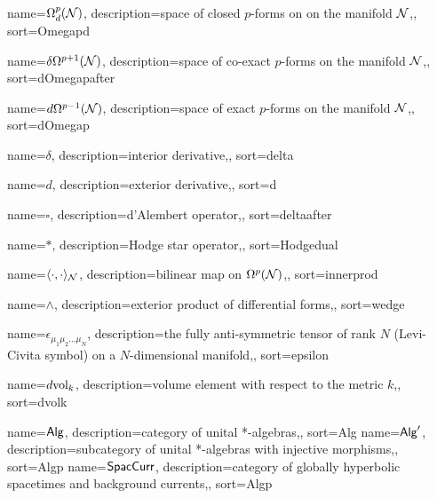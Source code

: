{
	name=\ensuremath{\Omega^p_{d}(\N)},
	description={space of closed $p$-forms on on the manifold $\mathcal{N}$,},
	sort={Omegapd}
}

{
	name=\ensuremath{\delta \Omega^{p+1}(\N)},
	description={space of co-exact $p$-forms on the manifold $\mathcal{N}$,},
	sort={dOmegapafter}
}

{
	name=\ensuremath{d \Omega^{p-1}(\N)},
	description={space of exact $p$-forms on the manifold $\mathcal{N}$,},
	sort={dOmegap}
}




{
	name=\ensuremath{\delta},
	description={interior derivative,},
	sort={delta}
}


{
	name=\ensuremath{d},
	description={exterior derivative,},
	sort={d}
}

{
	name=\ensuremath{\square},
	description={d'Alembert operator,},
	sort={deltaafter}
}




{
	name=\ensuremath{*},
	description={Hodge star operator,},
	sort={Hodgedual}
}



{
	name=\ensuremath{\langle \cdot , \cdot \rangle_{\N}},
	description={bilinear map on $\Omega^p(\mathcal{N})$,},
	sort={innerprod}
}



{
	name=\ensuremath{\wedge},
	description={exterior product of differential forms,},
	sort={wedge}
}



{
	name=\ensuremath{\epsilon_{\mu_1 \mu_2 ... \mu_N}},
	description={the fully anti-symmetric tensor of rank $N$ (Levi-Civita symbol) on a $N$-dimensional manifold,},
	sort={epsilon}
}



{
	name=\ensuremath{\dvolk},
	description={volume element with respect to the metric $k$,},
	sort={dvolk}
}





{
	name=\ensuremath{\Alg},
	description={category of unital *-algebras,},
	sort={Alg}
}
{
	name=\ensuremath{\Alg'},
	description={subcategory of unital *-algebras with injective morphisms,},
	sort={Algp}
}
{
	name=\ensuremath{\SpacCurr},
	description={category of globally hyperbolic spacetimes and background currents,},
	sort={Algp}
}

